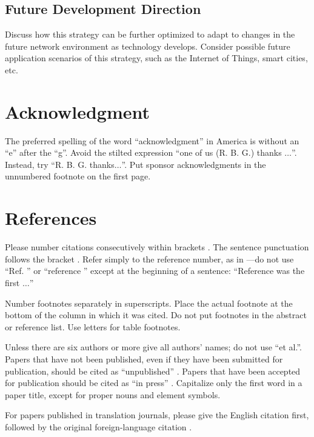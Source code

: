 \documentclass[conference]{IEEEtran}
\begin{document}
\subsection{Future Development Direction}
Discuss how this strategy can be further optimized to adapt to changes in the future network environment as technology develops. Consider possible future application scenarios of this strategy, such as the Internet of Things, smart cities, etc.


\section*{Acknowledgment}

The preferred spelling of the word ``acknowledgment'' in America is without 
an ``e'' after the ``g''. Avoid the stilted expression ``one of us (R. B. 
G.) thanks $\ldots$''. Instead, try ``R. B. G. thanks$\ldots$''. Put sponsor 
acknowledgments in the unnumbered footnote on the first page.

\section*{References}

Please number citations consecutively within brackets \cite{b1}. The 
sentence punctuation follows the bracket \cite{b2}. Refer simply to the reference 
number, as in \cite{b3}---do not use ``Ref. \cite{b3}'' or ``reference \cite{b3}'' except at 
the beginning of a sentence: ``Reference \cite{b3} was the first $\ldots$''

Number footnotes separately in superscripts. Place the actual footnote at 
the bottom of the column in which it was cited. Do not put footnotes in the 
abstract or reference list. Use letters for table footnotes.

Unless there are six authors or more give all authors' names; do not use 
``et al.''. Papers that have not been published, even if they have been 
submitted for publication, should be cited as ``unpublished'' \cite{b4}. Papers 
that have been accepted for publication should be cited as ``in press'' \cite{b5}. 
Capitalize only the first word in a paper title, except for proper nouns and 
element symbols.

For papers published in translation journals, please give the English 
citation first, followed by the original foreign-language citation \cite{b6}.
\end{document}

